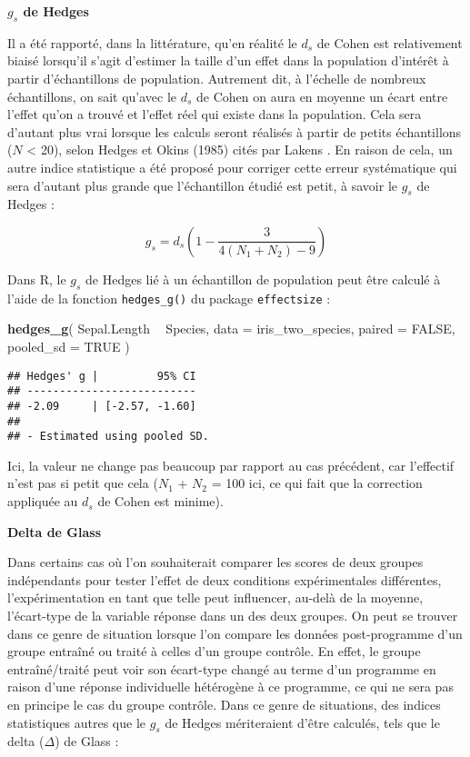\documentclass[
  french,
]{book}
\newenvironment{Shaded}{\begin{snugshade}}{\end{snugshade}}
\newcommand{\DataTypeTok}[1]{\textcolor[rgb]{0.13,0.29,0.53}{#1}}
\newcommand{\KeywordTok}[1]{\textcolor[rgb]{0.13,0.29,0.53}{\textbf{#1}}}
\newcommand{\NormalTok}[1]{#1}
\newcommand{\OperatorTok}[1]{\textcolor[rgb]{0.81,0.36,0.00}{\textbf{#1}}}
\newcommand{\OtherTok}[1]{\textcolor[rgb]{0.56,0.35,0.01}{#1}}
\newcommand{\StringTok}[1]{\textcolor[rgb]{0.31,0.60,0.02}{#1}}
\begin{document}
\textbf{\(g_{s}\) de Hedges}

Il a été rapporté, dans la littérature, qu'en réalité le \(d_{s}\) de Cohen est relativement biaisé lorsqu'il s'agit d'estimer la taille d'un effet dans la population d'intérêt à partir d'échantillons de population. Autrement dit, à l'échelle de nombreux échantillons, on sait qu'avec le \(d_{s}\) de Cohen on aura en moyenne un écart entre l'effet qu'on a trouvé et l'effet réel qui existe dans la population. Cela sera d'autant plus vrai lorsque les calculs seront réalisés à partir de petits échantillons (\(N\) \textless{} 20), selon Hedges et Okins (1985) cités par Lakens \autocite*{lakensCalculatingReportingEffect2013}. En raison de cela, un autre indice statistique a été proposé pour corriger cette erreur systématique qui sera d'autant plus grande que l'échantillon étudié est petit, à savoir le \(g_{s}\) de Hedges :

\[g_{s} = d_{s} (1 - \frac{3}{4(N_{1} + N_{2}) - 9})\]

Dans R, le \(g_{s}\) de Hedges lié à un échantillon de population peut être calculé à l'aide de la fonction \texttt{hedges\_g()} du package \texttt{effectsize} :

\begin{Shaded}
\begin{Highlighting}[]
\KeywordTok{hedges_g}\NormalTok{(}
\NormalTok{  Sepal.Length }\OperatorTok{~}\StringTok{ }\NormalTok{Species,}
  \DataTypeTok{data =}\NormalTok{ iris_two_species, }
  \DataTypeTok{paired =} \OtherTok{FALSE}\NormalTok{, }
  \DataTypeTok{pooled_sd =} \OtherTok{TRUE}
\NormalTok{  )}
\end{Highlighting}
\end{Shaded}

\begin{verbatim}
## Hedges' g |         95% CI
## --------------------------
## -2.09     | [-2.57, -1.60]
## 
## - Estimated using pooled SD.
\end{verbatim}

Ici, la valeur ne change pas beaucoup par rapport au cas précédent, car l'effectif n'est pas si petit que cela (\(N_{1}\) + \(N_{2}\) = 100 ici, ce qui fait que la correction appliquée au \(d_{s}\) de Cohen est minime).

\textbf{Delta de Glass}

Dans certains cas où l'on souhaiterait comparer les scores de deux groupes indépendants pour tester l'effet de deux conditions expérimentales différentes, l'expérimentation en tant que telle peut influencer, au-delà de la moyenne, l'écart-type de la variable réponse dans un des deux groupes. On peut se trouver dans ce genre de situation lorsque l'on compare les données post-programme d'un groupe entraîné ou traité à celles d'un groupe contrôle. En effet, le groupe entraîné/traité peut voir son écart-type changé au terme d'un programme en raison d'une réponse individuelle hétérogène à ce programme, ce qui ne sera pas en principe le cas du groupe contrôle. Dans ce genre de situations, des indices statistiques autres que le \(g_{s}\) de Hedges mériteraient d'être calculés, tels que le delta (\(\Delta\)) de Glass \autocite{lakensCalculatingReportingEffect2013} :
\end{document}
